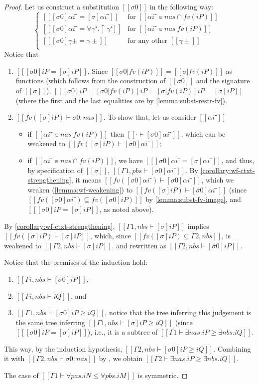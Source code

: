 \begin{proof}
  Let us construct a substitution $[[σ0]]$ in the following way:
  $$
  \begin{cases}
      [[ [σ0]αi⁻ = [σ]αi⁻  ]] & \text{for $[[αi⁻ ∊ {nas} ∩ fv(iP)]]$ }\\
      [[ [σ0]αi⁻ = ∀γ⁺.↑γ⁺ ]] & \text{for $[[αi⁻ ∊ {nas} \ fv(iP)]]$ }\\
      [[ [σ0]γ±  = γ± ]]      & \text{for any other $[[γ±]]$ }\\
  \end{cases}
  $$
  Notice that 
  \begin{enumerate}
    \item $[[ [σ0]iP = [σ]iP ]]$.
      Since $[[σ0|fv(iP)]] = [[σ|fv(iP)]]$ as functions
      (which follows from the construction of 
      $[[σ0]]$ and the signature of $[[σ]]$), 
      $[[ [σ0]iP = [σ0|fv(iP)]iP = [σ|fv(iP)]iP = [σ]iP]]$
      (where the first and the last equalities are by
       \cref{lemma:subst-restr-fv}).

    \item $[[  fv([σ]iP) ⊢ σ0 :{nas}]]$.
      To show that, let us consider $[[αi⁻]]$ 
      \begin{itemize}
        \item if $[[αi⁻ ∊ {nas} \ fv(iP)]]$ then
          $[[· ⊢ [σ0]αi⁻]]$, which can be weakened to 
          $[[ fv([σ]iP) ⊢ [σ0]αi⁻]]$;
        \item if $[[αi⁻ ∊ {nas} ∩ fv(iP)]]$, 
          we have $[[ [σ0]αi⁻ = [σ]αi⁻ ]]$, and thus, by
          specification of $[[σ]]$, $[[Γ1, pbs ⊢ [σ0]αi⁻ ]]$. 
          By \cref{corollary:wf-ctxt-strengthening}, 
          it means $[[ fv([σ0]αi⁻) ⊢ [σ0]αi⁻]]$,
          which we weaken (\cref{lemma:wf-weakening}) 
          to $[[ fv([σ]iP) ⊢ [σ0]αi⁻]]$ 
          (since $[[fv([σ0]αi⁻) ⊆ fv([σ0]iP)]]$ by \cref{lemma:subst-fv-image},
          and $[[ [σ0]iP = [σ]iP]]$, as noted above).
      \end{itemize} 
  \end{enumerate}

  By \cref{corollary:wf-ctxt-strengthening}, 
  $[[Γ1, nbs ⊢ [σ]iP]]$ implies 
  $[[  fv([σ]iP) ⊢ [σ]iP ]]$, which,
  since $[[fv([σ]iP) ⊆ Γ2, nbs]]$,
  is weakened to $[[Γ2, nbs ⊢ [σ]iP]]$.
  and rewritten as $[[Γ2, nbs ⊢ [σ0]iP]]$.
  
  Notice that the premises of the induction hold:
  \begin{enumerate}
    \item $[[Γi, nbs ⊢ [σ0]iP]]$, 
    \item $[[Γi, nbs ⊢ iQ]]$, and
    \item $[[Γ1, nbs ⊢ [σ0]iP ≥ iQ ]]$, 
      notice that the tree inferring this judgement 
      is the same tree inferring $[[Γ1, nbs ⊢ [σ]iP ≥ iQ ]]$ 
      (since $[[ [σ0]iP = [σ]iP]]$), i.e., 
      it is a subtree of $[[Γ1 ⊢ ∃nas.iP ≥ ∃nbs.iQ]]$.
  \end{enumerate}
  This way, by the induction hypothesis,
  $[[Γ2, nbs ⊢ [σ0]iP ≥ iQ ]]$.
  Combining it with $[[ Γ2, nbs ⊢ σ0 :{nas}]]$
  by ,
  we obtain $[[Γ2 ⊢ ∃nas.iP ≥ ∃nbs.iQ]]$.

  The case of $[[Γ1 ⊢ ∀pas.iN ≤ ∀pbs.iM]]$ is symmetric.
\end{proof}


